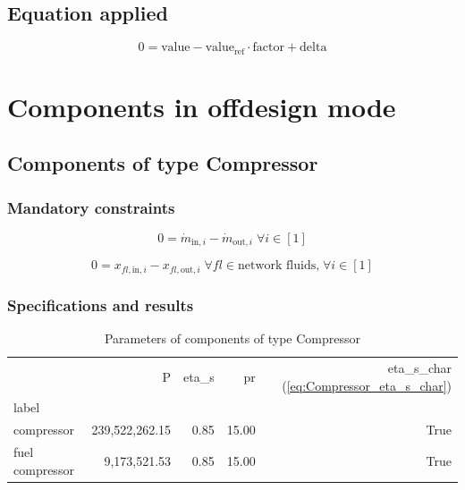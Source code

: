 \documentclass[]{article}
\begin{document}
\subsection{Equation applied}

\begin{equation}
\label{eq:Connection_ref}
0 = \text{value} - \text{value}_\mathrm{ref} \cdot \mathrm{factor} + \text{delta}
\end{equation}

\section{Components in offdesign mode}

\subsection{Components of type Compressor}

\subsubsection{Mandatory constraints}

\begin{equation}
\label{eq:Compressor_mass_flow_constraints}
0=\dot{m}_{\mathrm{in,}i}-\dot{m}_{\mathrm{out,}i}\; \forall i \in [1]
\end{equation}

\begin{equation}
\label{eq:Compressor_fluid_constraints}
0=x_{fl\mathrm{,in,}i}-x_{fl\mathrm{,out,}i}\;\forall fl \in\text{network fluids,}\; \forall i \in [1]
\end{equation}


\subsubsection{Specifications and results}

\begin{table}[H]
\centering
\caption{Parameters of components of type Compressor}
\begin{tabular}{lrrrr}
\toprule
{} &               P & eta\_s &     pr &  eta\_s\_char (\ref{eq:Compressor_eta_s_char}) \\
label           &                 &        &        &                                                \\
\midrule
compressor      &  239,522,262.15 &   0.85 &  15.00 &                                           True \\
fuel compressor &    9,173,521.53 &   0.85 &  15.00 &                                           True \\
\bottomrule
\end{tabular}
\end{table}
\end{document}
